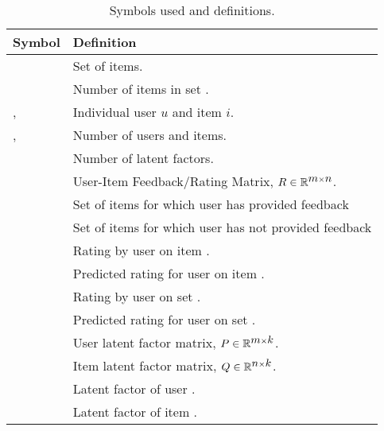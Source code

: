 \begin{table}[htb]
    \begin{center}
    \caption{Symbols used and definitions.}
    \label{tbl:notations}
    \begin{tabular}{
		@{\hspace{2pt}}l@{\hspace{2pt}} 
		@{\hspace{2pt}}l@{\hspace{2pt}}
	}
	\hline
	\bf{Symbol}	&	\bf{Definition}	\\
	\hline
	\sets               &   Set of items. \\ 
	\setsz          &   Number of items in set \sets. \\
	\usru, \itmi	    &	Individual user $u$ and item $i$. \\
	\nusers, \nitems	&	Number of users and items.\\ %
	\nfactors		&	Number of latent factors.	\\
	
	\rmat			&	User-Item Feedback/Rating Matrix, $\mbox{$R$} \in \mathbb{R}^{\mbox{$m$} \times \mbox{$n$}}$. \\
	\rplusu			&	Set of items for which user \usru has provided feedback	\\
	\rminusu		&	Set of items for which user \usru has not provided feedback	\\
	\rui			& 	Rating by user \usru on item \itmi. \\
	\ruih			& 	Predicted rating for user \usru on item \itmi. \\
	
    \rus			& 	Rating by user \usru on set \sets. \\
	\rush			& 	Predicted rating for user \usru on set \sets. \\
	
	\pmat			&	User latent factor matrix, $\mbox{$P$} \in \mathbb{R}^{\mbox{$m$} \times \mbox{$k$}}$.\\
	\qmat			&	Item latent factor matrix, $\mbox{$Q$} \in \mathbb{R}^{\mbox{$n$} \times \mbox{$k$}}$.\\
	
	\puvec          &   Latent factor of user \usru. \\
	\qivec          &   Latent factor of item \itmi. \\
	
	\hline
	\end{tabular}
	\end{center}
\end{table}




